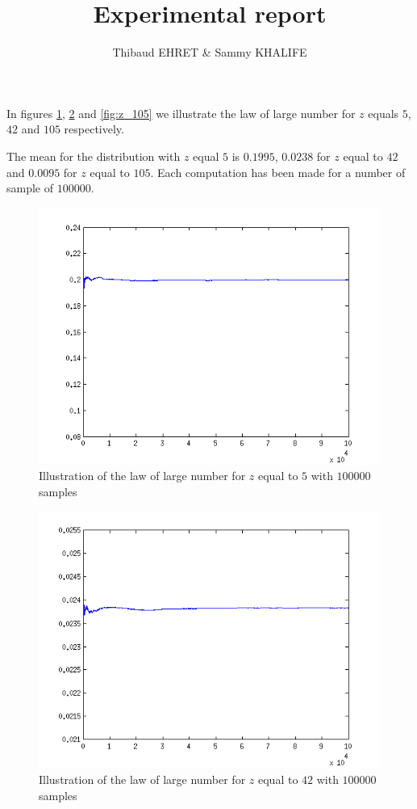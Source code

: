 \documentclass[a4paper]{article}
\author{Thibaud EHRET \& Sammy KHALIFE}
\title{Experimental report}
\begin{document}
\maketitle

In figures \ref{fig:z_5}, \ref{fig:z_42} and \ref{fig:z_105} we illustrate the law of large number for $z$ equals $5$, $42$ and $105$ respectively.

The mean for the distribution with $z$ equal $5$ is $0.1995$, $0.0238$ for $z$ equal to $42$ and $0.0095$ for $z$ equal to $105$. Each computation has been made for a number of sample of $100000$.

\begin{figure}[!Hbt]
	\centering
	\includegraphics[scale=0.7]{z_5.png}
	\caption{Illustration of the law of large number for $z$ equal to $5$ with $100000$ samples}
	\label{fig:z_5}
\end{figure}

\begin{figure}[!Hbt]
	\centering
	\includegraphics[scale=0.7]{z_42.png}
	\caption{Illustration of the law of large number for $z$ equal to $42$ with $100000$ samples}
	\label{fig:z_42}
\end{figure}
\end{document}
